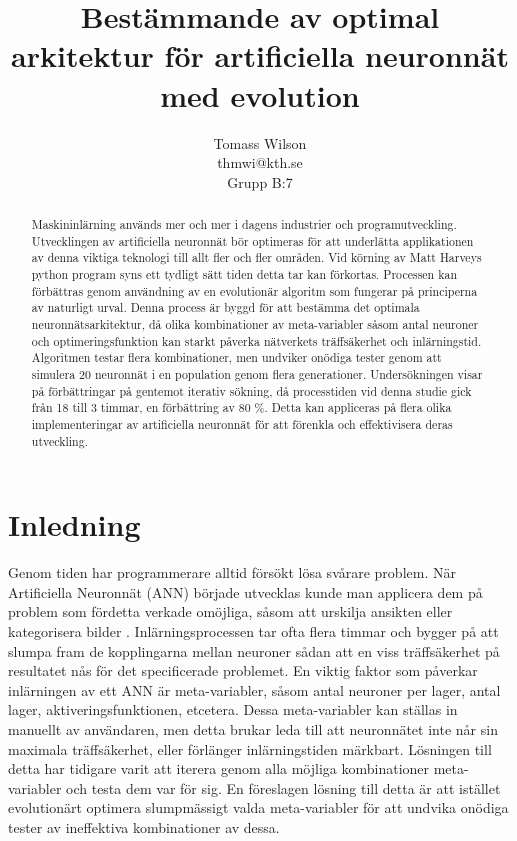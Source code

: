 \documentclass[a4paper, 12pt]{article}
\title{Bestämmande av optimal arkitektur för artificiella neuronnät med evolution}
\author{Tomass Wilson\\thmwi@kth.se\\Grupp B:7}
\begin{document}

  \maketitle

  \begin{abstract}
    Maskininlärning används mer och mer i dagens industrier och programutveckling. Utvecklingen av artificiella neuronnät bör optimeras för att underlätta applikationen av denna viktiga teknologi till allt fler och fler områden. Vid körning av Matt Harveys python program \parencite{harvey2017} syns ett tydligt sätt tiden detta tar kan förkortas. Processen kan förbättras genom användning av en evolutionär algoritm som fungerar på principerna av naturligt urval. Denna process är byggd för att bestämma det optimala neuronnätsarkitektur, då olika kombinationer av meta-variabler såsom antal neuroner och optimeringsfunktion kan starkt påverka nätverkets träffsäkerhet och inlärningstid. Algoritmen testar flera kombinationer, men undviker onödiga tester genom att simulera 20 neuronnät i en population genom flera generationer. Undersökningen visar på förbättringar på gentemot iterativ sökning, då processtiden vid denna studie gick från 18 till 3 timmar, en förbättring av 80 \%. Detta kan appliceras på flera olika implementeringar av artificiella neuronnät för att förenkla och effektivisera deras utveckling.
  \end{abstract}

  \newpage


  \tableofcontents

  \newpage


  \section{Inledning}
    Genom tiden har programmerare alltid försökt lösa svårare problem. När Artificiella Neuronnät (ANN) började utvecklas kunde man applicera dem på problem som fördetta verkade omöjliga, såsom att urskilja ansikten eller kategorisera bilder \parencite{hopfield1988artificial}. Inlärningsprocessen tar ofta flera timmar och bygger på att slumpa fram de kopplingarna mellan neuroner sådan att en viss träffsäkerhet på resultatet nås för det specificerade problemet. En viktig faktor som påverkar inlärningen av ett ANN är meta-variabler, såsom antal neuroner per lager, antal lager, aktiveringsfunktionen, etcetera. Dessa meta-variabler kan ställas in manuellt av användaren, men detta brukar leda till att neuronnätet inte når sin maximala träffsäkerhet, eller förlänger inlärningstiden märkbart. Lösningen till detta har tidigare varit att iterera genom alla möjliga kombinationer meta-variabler och testa dem var för sig. En föreslagen lösning till detta är att istället evolutionärt optimera slumpmässigt valda meta-variabler för att undvika onödiga tester av ineffektiva kombinationer av dessa.
\end{document}

